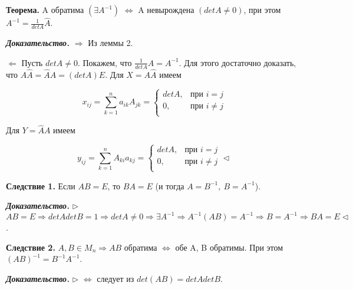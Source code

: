 \vspace{\baselineskip}
\textbf{Теорема.} A обратима $(\exists A^{-1})$ $\Leftrightarrow$ A невырождена $(detA \neq 0)$, при этом $A^{-1} = \frac{1}{detA} \widehat{A}$.

\vspace{\baselineskip}
\textbf{\textit{Доказательство.}} $\Rightarrow$ Из леммы 2.

$\Leftarrow$ Пусть $detA \neq 0$. Покажем, что $\frac{1}{detA} \widehat{A} = A^{-1}$. Для этого достаточно доказать, что $A \widehat{A} = \widehat{A} A = (detA) E$. Для $X = A \widehat{A}$ имеем

\begin{equation*}
	x_{ij} = \sum\limits_{k = 1}^n a_{ik} A_{jk} = \begin{cases}
		detA, &\text{при }  i = j  \\
		0, &\text{при } i \neq j \\
	\end{cases}
\end{equation*}

\vspace{\baselineskip}
Для $Y = \widehat{A} A$ имеем 

\begin{equation*}
	y_{ij} = \sum\limits_{k = 1}^n A_{ki} a_{kj} = \begin{cases}
		detA, &\text{при }  i = j  \\
		0, &\text{при } i \neq j \\
	\end{cases} \lhd
\end{equation*}

\vspace{\baselineskip}
\textbf{Следствие 1.} Если $AB = E$, то $BA = E$ (и тогда $A = B^{-1}, \ B = A^{-1}$).

\vspace{\baselineskip}
\textbf{\textit{Доказательство.}} $\rhd$ $AB = E \Rightarrow detA detB = 1 \Rightarrow detA \neq 0 \Rightarrow \exists A^{-1} \Rightarrow A^{-1}(AB) = A^{-1} \Rightarrow B = A^{-1} \Rightarrow BA = E \lhd$.

\vspace{\baselineskip}
\textbf{Следствие 2.} $A, B \in M_n \Rightarrow AB$ обратима $\Leftrightarrow$ обе A, B обратимы. При этом $(AB)^{-1} = B^{-1} A^{-1}$.

\vspace{\baselineskip}
\textbf{\textit{Доказательство.}} $\rhd$ $\Leftrightarrow$ следует из $det(AB) = detA detB$.

